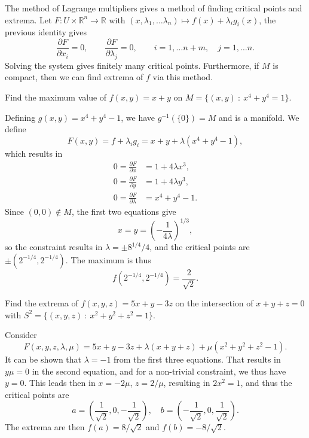 \documentclass[letter-paper]{tufte-book}
\newenvironment{example}[1][Example]{\begin{trivlist}
\item[\hskip \labelsep {\bfseries #1}]}{\end{trivlist}}
\begin{document}
The method of Lagrange multipliers gives a method of finding critical
points and extrema. Let $F : U \times \mathbb{R}^n \to \mathbb{R}$ with $(x, \lambda_1,
\ldots \lambda_n) \mapsto f(x) + \lambda_i g_i(x)$, the previous identity gives
\begin{equation}
  \frac{\partial F}{\partial x_i} = 0, \qquad \frac{\partial F}{\partial
  \lambda_j} = 0, \qquad i = 1, \ldots n+m, \quad j = 1,\ldots n.
\end{equation}
Solving the system gives finitely many critical points. Furthermore, if $M$ is
compact, then we can find extrema of $f$ via this method.

\begin{example}
  Find the maximum value of $f(x,y) = x+y$ on $M = \{(x,y)\ : \ x^4 + y^4 = 1\}$.
  
  Defining $g(x,y) = x^4 + y^4 - 1$, we have $g^{-1}(\{0\}) = M$ and is a
  manifold. We define
  \begin{equation*}
    F(x,y) = f + \lambda_i g_i = x + y + \lambda(x^4 + y^4 -1),
  \end{equation*}
  which results in
  \begin{align*}
    0 = \frac{\partial F}{\partial x} &= 1 + 4\lambda x^3,\\
    0 = \frac{\partial F}{\partial y} &= 1 + 4\lambda y^3,\\
    0 = \frac{\partial F}{\partial \lambda} &= x^4 + y^4 - 1.
  \end{align*}
  Since $(0,0) \notin M$, the first two equations give
  \begin{equation*}
    x = y = \left(-\frac{1}{4\lambda}\right)^{1/3},
  \end{equation*}
  so the constraint results in $\lambda = \pm 8^{1/4}/4$, and the critical
  points are $\pm(2^{-1/4}, 2^{-1/4})$. The maximum is thus
  \begin{equation*}
    f(2^{-1/4}, 2^{-1/4}) = \frac{2}{\sqrt{2}}.
  \end{equation*}
\end{example}

\begin{example}
  Find the extrema of $f(x,y,z) = 5x + y - 3z$ on the intersection of $x + y + z
  = 0$ with $S^2 = \{(x,y,z)\ : \ x^2 + y^2 + z^2 = 1\}$.
  
  Consider
  \begin{equation*}
    F(x,y,z,\lambda,\mu) = 5x + y - 3z + \lambda(x + y + z) + \mu(x^2 + y^2 + z^2 - 1).
  \end{equation*}
  It can be shown that $\lambda = -1$ from the first three equations. That
  results in $y\mu = 0$ in the second equation, and for a non-trivial
  constraint, we thus have $y=0$. This leads then in $x = -2\mu$, $z = 2/\mu$,
  resulting in $2x^2 = 1$, and thus the critical points are
  \begin{equation*}
    a = \left(\frac{1}{\sqrt{2}}, 0, -\frac{1}{\sqrt{2}}\right), \quad
    b = \left(-\frac{1}{\sqrt{2}}, 0, \frac{1}{\sqrt{2}}\right).
  \end{equation*}
  The extrema are then $f(a) = 8/\sqrt{2}$ and $f(b) = -8/\sqrt{2}$.
\end{example}
\end{document}
